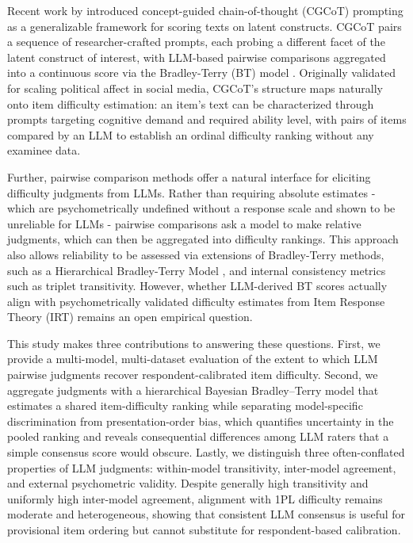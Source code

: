 \documentclass[11pt]{article}
\begin{document}
Recent work by \citet{wuConceptGuidedChainofThoughtPrompting2024} introduced concept-guided chain-of-thought (CGCoT) prompting as a generalizable framework for scoring texts on latent constructs. CGCoT pairs a sequence of researcher-crafted prompts, each probing a different facet of the latent construct of interest, with LLM-based pairwise comparisons aggregated into a continuous score via the Bradley-Terry (BT) model \citep{bradleyRankAnalysisIncomplete1952}. Originally validated for scaling political affect in social media, CGCoT's structure maps naturally onto item difficulty estimation: an item's text can be characterized through prompts targeting cognitive demand and required ability level, with pairs of items compared by an LLM to establish an ordinal difficulty ranking without any examinee data.

Further, pairwise comparison methods offer a natural interface for eliciting difficulty judgments from LLMs. Rather than requiring absolute estimates - which are psychometrically undefined without a response scale and shown to be unreliable for LLMs \citep{lichtMeasuringScalarConstructs2025} - pairwise comparisons ask a model to make relative judgments, which can then be aggregated into difficulty rankings. This approach also allows reliability to be assessed via extensions of Bradley-Terry methods, such as a Hierarchical Bradley-Terry Model \citep{bockenholtHierarchicalModelingPaired2001}, and internal consistency metrics such as triplet transitivity. However, whether LLM-derived BT scores actually align with psychometrically validated difficulty estimates from Item Response Theory (IRT) remains an open empirical question.

This study makes three contributions to answering these questions. First, we provide a multi-model, multi-dataset evaluation of the extent to which LLM pairwise judgments recover respondent-calibrated item difficulty. Second, we aggregate judgments with a hierarchical Bayesian Bradley--Terry model that estimates a shared item-difficulty ranking while separating model-specific discrimination from presentation-order bias, which quantifies uncertainty in the pooled ranking and reveals consequential differences among LLM raters that a simple consensus score would obscure. Lastly, we distinguish three often-conflated properties of LLM judgments: within-model transitivity, inter-model agreement, and external psychometric validity. Despite generally high transitivity and uniformly high inter-model agreement, alignment with 1PL difficulty remains moderate and heterogeneous, showing that consistent LLM consensus is useful for provisional item ordering but cannot substitute for respondent-based calibration.
\end{document}
